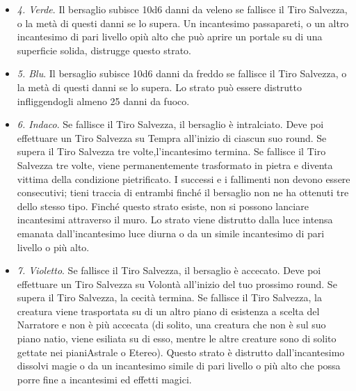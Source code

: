 \begin{multicols}{2}
\begin{itemize}
\textit{2. Arancio}. Il bersaglio subisce 10d6 danni da acido se fallisce il Tiro Salvezza, o la metà di questi danni se lo supera. Finché questo strato esiste, gli attacchi a distanza magici non possono attraversare il muro. Lo strato può essere distrutto da un forte vento. 3. Giallo. Il bersaglio subisce 10d6 danni da fulmine se fallisce il Tiro Salvezza, o la metà di questi danni se lo supera. Questo strato può essere distrutto infliggendogli 60 danni di forza.
\item
\textit{4. Verde}. Il bersaglio subisce 10d6 danni da veleno se fallisce il Tiro Salvezza, o la metà di questi danni se lo supera. Un incantesimo passapareti, o un altro incantesimo di pari livello opiù alto che può aprire un  portale su di una superficie solida, distrugge questo strato.
\item
\textit{5. Blu}. Il bersaglio subisce 10d6 danni da freddo se fallisce il Tiro Salvezza, o la metà di questi danni se lo supera. Lo strato può essere distrutto infliggendogli almeno 25 danni da fuoco.
\item
\textit{6. Indaco}. Se fallisce il Tiro Salvezza, il bersaglio è intralciato. Deve poi effettuare un Tiro Salvezza su Tempra all'inizio di ciascun suo round. Se supera il Tiro Salvezza tre volte,l'incantesimo termina. Se fallisce  il Tiro Salvezza tre volte, viene permanentemente trasformato in pietra e diventa vittima della condizione  pietrificato. I successi e i fallimenti non devono essere consecutivi; tieni traccia di entrambi finché il bersaglio non ne ha ottenuti tre dello stesso tipo. Finché questo strato esiste, non si possono lanciare incantesimi attraverso il muro. Lo strato viene distrutto dalla luce intensa emanata dall'incantesimo luce diurna  o da un simile incantesimo di pari livello o più alto.
\item
\textit{7. Violetto}. Se fallisce il Tiro Salvezza, il bersaglio è accecato. Deve poi effettuare un Tiro Salvezza su Volontà all'inizio del tuo prossimo round. Se supera il Tiro Salvezza, la cecità termina. Se fallisce il Tiro Salvezza, la creatura viene trasportata su di un altro piano di esistenza a scelta del Narratore e non è più accecata (di solito, una creatura che non è sul suo piano natio, viene esiliata su di esso, mentre le altre creature sono di solito gettate nei pianiAstrale o Etereo). Questo  strato è distrutto dall'incantesimo dissolvi magie o da un incantesimo simile di pari livello o più alto che possa porre fine a incantesimi ed effetti magici.
\end{itemize}


\end{multicols}

